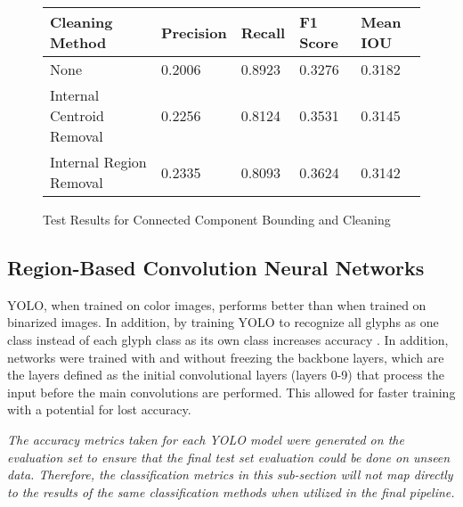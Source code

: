 \begin{figure}[H]
    \caption{Test Results for Connected Component Bounding and Cleaning}
    \label{fig:ccBoundingEval}
    \centering
    \begin{tabular}{ | l | l | l | l | l | }
        \hline
        Cleaning Method & Precision & Recall & F1 Score & Mean IOU \\
        \hline
        None & 0.2006 & 0.8923 & 0.3276 & 0.3182 \\
        Internal Centroid Removal & 0.2256 & 0.8124 & 0.3531 & 0.3145 \\
        Internal Region Removal & 0.2335 & 0.8093 & 0.3624 & 0.3142 \\
        \hline
    \end{tabular}
\end{figure}

\subsection{Region-Based Convolution Neural Networks}

YOLO, when trained on color images, performs better than when trained on binarized images. In addition, by training YOLO to recognize all glyphs as one class instead of each glyph class as its own class increases accuracy . In addition, networks were trained with and without freezing the backbone layers, which are the layers defined as the initial convolutional layers (layers 0-9) \cite{YoloBackbone} that process the input before the main convolutions are performed. This allowed for faster training with a potential for lost accuracy.

\textit{The accuracy metrics taken for each YOLO model were generated on the evaluation set to ensure that the final test set evaluation could be done on unseen data. Therefore, the classification metrics in this sub-section will not map directly to the results of the same classification methods when utilized in the final pipeline.}


